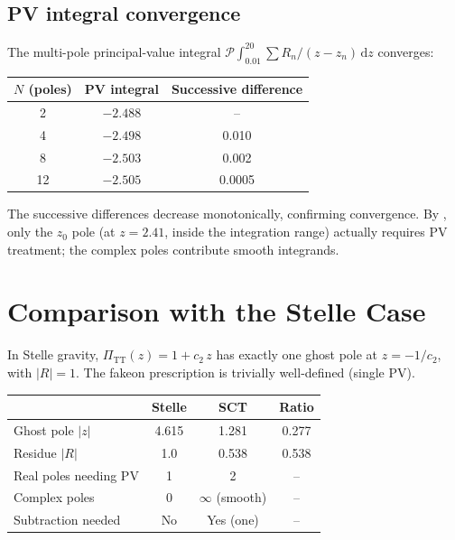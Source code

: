 \documentclass[11pt,a4paper]{article}
\newcommand{\dd}{\mathrm{d}}
\newcommand{\PiTT}{\Pi_{\mathrm{TT}}}
\newcommand{\PV}{\mathcal{P}}
\begin{document}
\subsection{PV integral convergence}

The multi-pole principal-value integral $\PV\!\int_{0.01}^{20}
\sum R_n/(z - z_n)\,\dd z$ converges:

\begin{center}
\begin{tabular}{ccc}
\toprule
$N$ (poles) & PV integral & Successive difference \\
\midrule
2 & $-2.488$ & -- \\
4 & $-2.498$ & 0.010 \\
8 & $-2.503$ & 0.002 \\
12 & $-2.505$ & 0.0005 \\
\bottomrule
\end{tabular}
\end{center}

\noindent
The successive differences decrease monotonically, confirming convergence.
By , only the $z_0$ pole (at $z = 2.41$, inside the
integration range) actually requires PV treatment; the complex poles
contribute smooth integrands.


\section{Comparison with the Stelle Case}
\label{sec:stelle}

In Stelle gravity, $\PiTT(z) = 1 + c_2\,z$ has exactly one ghost pole
at $z = -1/c_2$, with $|R| = 1$.  The fakeon prescription is trivially
well-defined (single PV).

\begin{center}
\begin{tabular}{lccc}
\toprule
 & Stelle & SCT & Ratio \\
\midrule
Ghost pole $|z|$ & 4.615 & 1.281 & 0.277 \\
Residue $|R|$ & 1.0 & 0.538 & 0.538 \\
Real poles needing PV & 1 & 2 & -- \\
Complex poles & 0 & $\infty$ (smooth) & -- \\
Subtraction needed & No & Yes (one) & -- \\
\bottomrule
\end{tabular}
\end{center}
\end{document}
